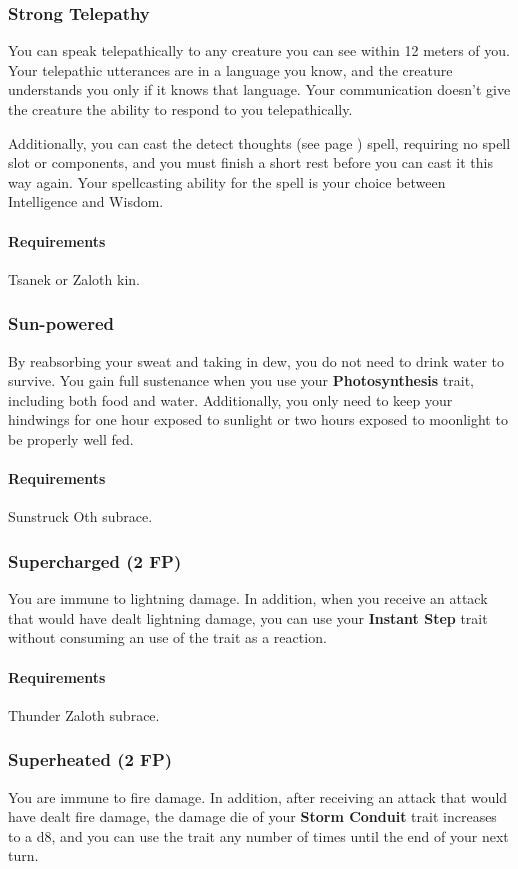 \subsubsection{Strong Telepathy} \label{feat::strongtelepathy}
    You can speak telepathically to any creature you can see within 12 meters of you.
    Your telepathic utterances are in a language you know, and the creature understands you only if it knows that language.
    Your communication doesn't give the creature the ability to respond to you telepathically.

    Additionally, you can cast the detect thoughts (see page \pageref{spell::detectthoughts}) spell, requiring no spell slot or components, and you must finish a short rest before you can cast it this way again.
    Your spellcasting ability for the spell is your choice between Intelligence and Wisdom.
    \paragraph{Requirements} Tsanek or Zaloth kin.
\subsubsection{Sun-powered} \label{feat::sunpowered}
    By reabsorbing your sweat and taking in dew, you do not need to drink water to survive.
    You gain full sustenance when you use your \textbf{Photosynthesis} trait, including both food and water.
    Additionally, you only need to keep your hindwings for one hour exposed to sunlight or two hours exposed to moonlight to be properly well fed.
    \paragraph{Requirements} Sunstruck Oth subrace.
\subsubsection{Supercharged (2 FP)} \label{feat::supercharged}
    You are immune to lightning damage.
    In addition, when you receive an attack that would have dealt lightning damage, you can use your \textbf{Instant Step} trait without consuming an use of the trait as a reaction.
    \paragraph{Requirements} Thunder Zaloth subrace.
\subsubsection{Superheated (2 FP)} \label{feat::superheated}
    You are immune to fire damage.
    In addition, after receiving an attack that would have dealt fire damage, the damage die of your \textbf{Storm Conduit} trait increases to a d8, and you can use the trait any number of times until the end of your next turn.
